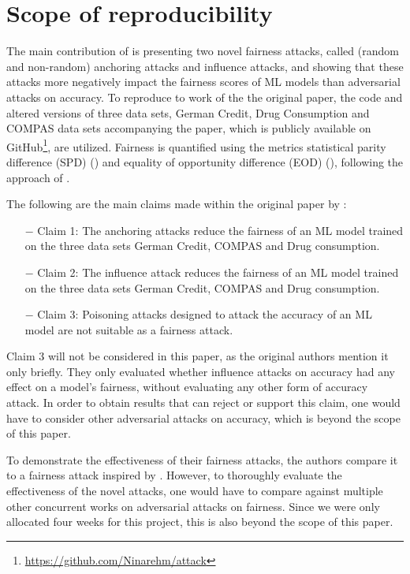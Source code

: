 \section{Scope of reproducibility}
\label{sec:claims}
The main contribution of \cite{mehrabi2020exacerbating} is presenting two novel fairness attacks, called (random and non-random) anchoring attacks and influence attacks, and showing that these attacks more negatively impact the fairness scores of ML models than adversarial attacks on accuracy. 
To reproduce to work of the the original paper, the code and altered versions of three data sets, German Credit, Drug Consumption and COMPAS data sets accompanying the paper, which is publicly available on GitHub\footnote{\href{https://github.com/Ninarehm/attack}{https://github.com/Ninarehm/attack}}, are utilized.
Fairness is quantified using the metrics statistical parity difference (SPD) (\cite{dwork2012fairness}) and equality of opportunity difference (EOD) (\cite{hardt2016equality}), following the approach of \cite{mehrabi2020exacerbating}.


The following are the main claims made within the original paper by \cite{mehrabi2020exacerbating}:
\begin{itemize}
    \item[$-$] Claim 1: The anchoring attacks reduce the fairness of an ML model trained on the three data sets German Credit, COMPAS and Drug consumption.
    \item[$-$] Claim 2: The influence attack reduces the fairness of an ML model trained on the three data sets German Credit, COMPAS and Drug consumption.
    \item[$-$] Claim 3: Poisoning attacks designed to attack the accuracy of an ML model are not suitable as a fairness attack.
\end{itemize}


Claim 3 will not be considered in this paper, as the original authors mention it only briefly. They only evaluated whether influence attacks on accuracy had any effect on a model's fairness, without evaluating any other form of accuracy attack.
In order to obtain results that can reject or support this claim, one would have to consider other adversarial attacks on accuracy, which is beyond the scope of this paper.

To demonstrate the effectiveness of their fairness attacks, the authors compare it to a fairness attack inspired by \cite{DBLP:journals/corr/abs-2004-07401}.
However, to thoroughly evaluate the effectiveness of the novel attacks, one would have to compare against multiple other concurrent works on adversarial attacks on fairness. Since we were only allocated four weeks for this project, this is also beyond the scope of this paper. 

